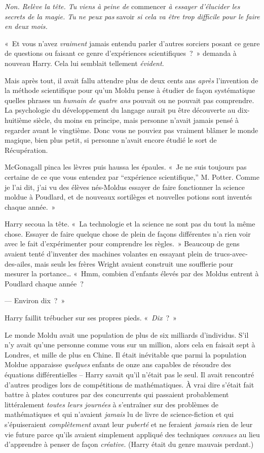 \emph{Non. Relève la tête. Tu viens à peine de} commencer \emph{à essayer d'élucider les secrets de la magie. Tu ne peux pas} savoir \emph{si cela va être trop difficile pour le faire en deux mois.}

«~Et vous n'avez \emph{vraiment} jamais entendu parler d'autres sorciers posant ce genre de questions ou faisant ce genre d'expériences scientifiques~?~» demanda à nouveau Harry.
Cela lui semblait tellement \emph{évident}.

Mais après tout, il avait fallu attendre plus de deux cents ans \emph{après} l'invention de la méthode scientifique pour qu'un Moldu pense à étudier de façon systématique quelles phrases un \emph{humain de quatre ans} pouvait ou ne pouvait pas comprendre.
La psychologie du développement du langage aurait pu être découverte au dix-huitième siècle, du moins en principe, mais personne n'avait jamais pensé à regarder avant le vingtième. Donc vous ne pouviez pas vraiment blâmer le monde magique, bien plus petit, si personne n'avait encore étudié le sort de Récupération.

McGonagall pinca les lèvres puis haussa les épaules.
«~Je ne suis toujours pas certaine de ce que vous entendez par “expérience scientifique,” M. Potter.
Comme je l'ai dit, j'ai vu des élèves nés-Moldus essayer de faire fonctionner la science moldue à Poudlard, et de nouveaux sortilèges et nouvelles potions sont inventés chaque année.~»

Harry secoua la tête.
«~La technologie et la science ne sont pas du tout la même chose.
Essayer de faire quelque chose de plein de façons différentes n'a rien voir avec le fait d'expérimenter pour comprendre les règles.~»
Beaucoup de gens avaient tenté d'inventer des machines volantes en essayant plein de trucs-avec-des-ailes, mais seuls les frères Wright avaient construit une soufflerie pour mesurer la portance…
«~Hmm, combien d'enfants élevés par des Moldus entrent à Poudlard chaque année~?

--- Environ dix~?~»

Harry faillit trébucher sur ses propres pieds. «~\emph{Dix}~?~»

Le monde Moldu avait une population de plus de six milliards d'individus.
S'il n'y avait qu'une personne comme vous sur un million, alors cela en faisait sept à Londres, et mille de plus en Chine.
Il était inévitable que parmi la population Moldue apparaisse \emph{quelques} enfants de onze ans capables de résoudre des équations différentielles --
Harry savait qu'il n'était pas le seul.  Il avait rencontré d'autres prodiges lors de compétitions de mathématiques.
À vrai dire s'était fait battre à plates coutures par des concurrents qui passaient probablement littéralement \emph{toutes leurs journées} à s'entraîner sur des problèmes de mathématiques et qui n'avaient \emph{jamais} lu de livre de science-fiction et qui s'épuiseraient \emph{complètement} avant leur \emph{puberté} et ne feraient \emph{jamais} rien de leur vie future parce qu'ils avaient simplement appliqué des techniques \emph{connues} au lieu d'apprendre à penser de façon \emph{créative}. (Harry était du genre mauvais perdant.)

